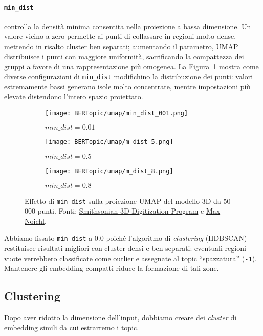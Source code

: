 \paragraph{\texttt{min\_dist}} controlla la densità minima consentita nella proiezione a bassa dimensione. Un valore vicino a zero permette ai punti di collassare in regioni molto dense, mettendo in risalto cluster ben separati; aumentando il parametro, UMAP distribuisce i punti con maggiore uniformità, sacrificando la compattezza dei gruppi a favore di una rappresentazione più omogenea. La Figura~\ref{fig:umap-min-dist} mostra come diverse configurazioni di \texttt{min\_dist} modifichino la distribuzione dei punti: valori estremamente bassi generano isole molto concentrate, mentre impostazioni più elevate distendono l'intero spazio proiettato.
\begin{figure}[H]
\centering

\begin{subfigure}{0.32\textwidth}
    \centering
    \texttt{[image: BERTopic/umap/min\_dist\_001.png]}
    \caption{$min\_dist = 0.01$}
\end{subfigure}\hfill
\begin{subfigure}{0.32\textwidth}
    \centering
    \texttt{[image: BERTopic/umap/m\_dist\_5.png]}
    \caption{$min\_dist = 0.5$}
\end{subfigure}\hfill
\begin{subfigure}{0.32\textwidth}
    \centering
    \texttt{[image: BERTopic/umap/m\_dist\_8.png]}
    \caption{$min\_dist = 0.8$}
\end{subfigure}
\caption{Effetto di \texttt{min\_dist} sulla proiezione UMAP del modello 3D da 50\,000 punti. Fonti: \href{https://3d.si.edu/object/3d/mammuthus-primigenius-blumbach:341c96cd-f967-4540-8ed1-d3fc56d31f12}{Smithsonian 3D Digitization Program} e \href{https://www.maxnoichl.eu/projects/mammoth/}{Max Noichl}.}
\label{fig:umap-min-dist}
\end{figure}
\noindent Abbiamo fissato \texttt{min\_dist} a $0.0$ poiché l'algoritmo di \emph{clustering} (HDBSCAN) restituisce risultati migliori con cluster densi e ben separati: eventuali regioni vuote verrebbero classificate come outlier e assegnate al topic ``spazzatura'' (\texttt{-1}). Mantenere gli embedding compatti riduce la formazione di tali zone.

\subsection{Clustering}
\noindent Dopo aver ridotto la dimensione dell'input, dobbiamo creare dei \textit{cluster} di embedding simili da cui estrarremo i topic.


